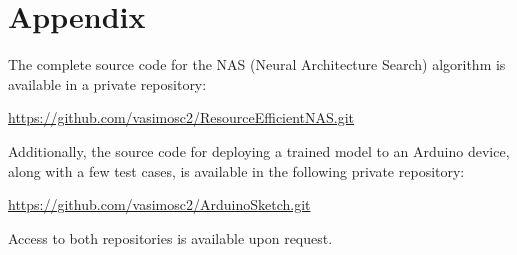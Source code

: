 \chapter{Appendix}

The complete source code for the NAS (Neural Architecture Search) algorithm is available in a private repository:

\url{https://github.com/vasimosc2/ResourceEfficientNAS.git}

Additionally, the source code for deploying a trained model to an Arduino device, along with a few test cases, is available in the following private repository:

\url{https://github.com/vasimosc2/ArduinoSketch.git}

Access to both repositories is available upon request.

